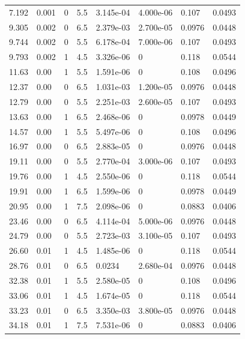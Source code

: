 \documentclass[preview]{standalone}
\begin{document}
{{\begin{tabular}{L{1.2cm}C{1.2cm} C{0.3cm}C{0.5cm} C{1.4cm}C{1.4cm} C{1.4cm}C{1.4cm}}
  7.192  &  0.001  & 0     & 5.5 &  3.145e-04  & 4.000e-06  & 0.107 &  0.0493   \\ 
  9.305  &  0.002  & 0     & 6.5 &  2.379e-03  & 2.700e-05  & 0.0976 &  0.0448   \\ 
  9.744  &  0.002  & 0     & 5.5 &  6.178e-04  & 7.000e-06  & 0.107 &  0.0493   \\ 
  9.793  &  0.002  & 1     & 4.5 &  3.326e-06  & 0  & 0.118 &  0.0544   \\ 
  11.63  &  0.00  & 1     & 5.5 &  1.591e-06  & 0  & 0.108 &  0.0496   \\ 
  12.37  &  0.00  & 0     & 6.5 &  1.031e-03  & 1.200e-05  & 0.0976 &  0.0448   \\ 
  12.79  &  0.00  & 0     & 5.5 &  2.251e-03  & 2.600e-05  & 0.107 &  0.0493   \\ 
  13.63  &  0.00  & 1     & 6.5 &  2.468e-06  & 0  & 0.0978 &  0.0449   \\ 
  14.57  &  0.00  & 1     & 5.5 &  5.497e-06  & 0  & 0.108 &  0.0496   \\ 
  16.97  &  0.00  & 0     & 6.5 &  2.883e-05  & 0  & 0.0976 &  0.0448   \\ 
  19.11  &  0.00  & 0     & 5.5 &  2.770e-04  & 3.000e-06  & 0.107 &  0.0493   \\ 
  19.76  &  0.00  & 1     & 4.5 &  2.550e-06  & 0  & 0.118 &  0.0544   \\ 
  19.91  &  0.00  & 1     & 6.5 &  1.599e-06  & 0  & 0.0978 &  0.0449   \\ 
  20.95  &  0.00  & 1     & 7.5 &  2.098e-06  & 0  & 0.0883 &  0.0406   \\ 
  23.46  &  0.00  & 0     & 6.5 &  4.114e-04  & 5.000e-06  & 0.0976 &  0.0448   \\ 
  24.79  &  0.00  & 0     & 5.5 &  2.723e-03  & 3.100e-05  & 0.107 &  0.0493   \\ 
  26.60  &  0.01  & 1     & 4.5 &  1.485e-06  & 0  & 0.118 &  0.0544   \\ 
  28.76  &  0.01  & 0     & 6.5 &  0.0234  & 2.680e-04  & 0.0976 &  0.0448   \\ 
  32.38  &  0.01  & 1     & 5.5 &  2.580e-05  & 0  & 0.108 &  0.0496   \\ 
  33.06  &  0.01  & 1     & 4.5 &  1.674e-05  & 0  & 0.118 &  0.0544   \\ 
  33.23  &  0.01  & 0     & 6.5 &  3.350e-03  & 3.800e-05  & 0.0976 &  0.0448   \\ 
  34.18  &  0.01  & 1     & 7.5 &  7.531e-06  & 0  & 0.0883 &  0.0406   \\ 

\end{tabular}}}
\end{document}
